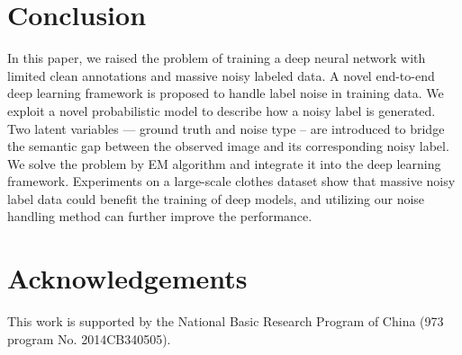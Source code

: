 \documentclass[10pt,twocolumn,letterpaper]{article}
\begin{document}
\section{Conclusion} %
\label{sec:conclusion}
In this paper, we raised the problem of training a deep neural network with limited clean annotations and massive noisy labeled data. A novel end-to-end deep learning framework is proposed to handle label noise in training data. We exploit a novel probabilistic model to describe how a noisy label is generated. Two latent variables --- ground truth and noise type -- are introduced to bridge the semantic gap between the observed image and its corresponding noisy label. We solve the problem by EM algorithm and integrate it into the deep learning framework. Experiments on a large-scale clothes dataset show that massive noisy label data could benefit the training of deep models, and utilizing our noise handling method can further improve the performance.

\section*{Acknowledgements}
\label{sec:acknowledgements}
This work is supported by the National Basic Research Program of China (973 program No. 2014CB340505).


{\small


}
\end{document}

